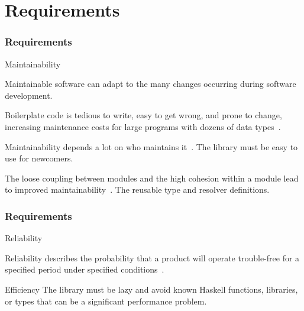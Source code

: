 \section{Requirements}

\begin{frame}\frametitle{Requirements}  

\begin{alertblock}{Maintainability}

Maintainable software can adapt to the many changes occurring during software development.~\cite{requirements-change-1,view-of-web, sof-sus-institute-maintainability}


\begin{itemize}

     Boilerplate code is tedious to write, easy to get wrong, and prone to change, increasing maintenance costs for large programs with dozens of data types~\cite{scrap-your-boilerplate}.

     Maintainability depends a lot on who maintains it~\cite{contr-reduce-maintainability}. The library must be easy to use for newcomers.

    The loose coupling between modules and the high cohesion within a module lead to improved maintainability~\cite{arc-modularity}.
    The reusable type and resolver definitions. 
    
\end{itemize}
\end{alertblock}
\end{frame}

\begin{frame}\frametitle{Requirements}  

\begin{block}{Reliability}

Reliability describes the probability that a product will operate trouble-free for a specified period under specified conditions~\cite{optimal-release-time}.

    

\end{block}

\begin{block}{Efficiency}
The library must be lazy and avoid known Haskell functions, libraries, or types that can be a significant performance problem.
\end{block}

\end{frame}